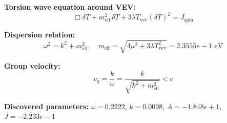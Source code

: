 
\textbf{Torsion wave equation around VEV:}
\begin{equation}
  \Box \delta T + m_{\text{eff}}^2 \, \delta T + 3\lambda T_{\text{vev}} (\delta T)^2 = J_{\text{spin}}
\end{equation}

\textbf{Dispersion relation:}
\begin{equation}
  \omega^2 = k^2 + m_{\text{eff}}^2, \quad
  m_{\text{eff}} = \sqrt{4\mu^2 + 3\lambda T_{\text{vev}}^2} = 2.3555e-1 \text{ eV}
\end{equation}

\textbf{Group velocity:}
\begin{equation}
  v_g = \frac{k}{\omega} = \frac{k}{\sqrt{k^2 + m_{\text{eff}}^2}} < c
\end{equation}

\textbf{Discovered parameters:}
$\omega = 0.2222$, \quad
$k = 0.0098$, \quad
$A = -1.848e+1$, \quad
$J = -2.233e-1$